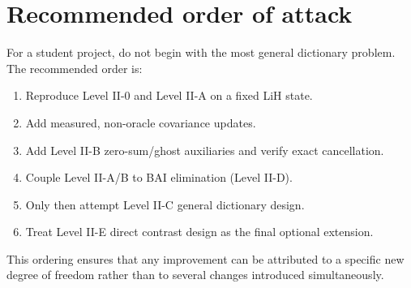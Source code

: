 \documentclass[11pt]{article}
\begin{document}
\section{Recommended order of attack}

For a student project, do not begin with the most general dictionary problem.  The recommended order is:
\begin{enumerate}[label=\textbf{Step \arabic*.}]
  \item Reproduce Level II-0 and Level II-A on a fixed LiH state.
  \item Add measured, non-oracle covariance updates.
  \item Add Level II-B zero-sum/ghost auxiliaries and verify exact cancellation.
  \item Couple Level II-A/B to BAI elimination (Level II-D).
  \item Only then attempt Level II-C general dictionary design.
  \item Treat Level II-E direct contrast design as the final optional extension.
\end{enumerate}
This ordering ensures that any improvement can be attributed to a specific new degree of freedom rather than to several changes introduced simultaneously.
\end{document}
